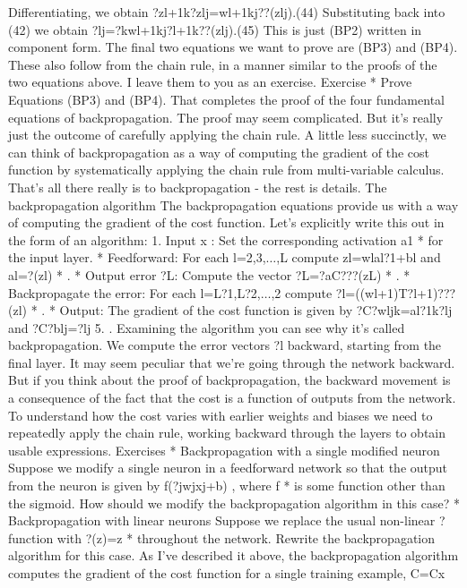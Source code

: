 Differentiating, we obtain 
?zl+1k?zlj=wl+1kj??(zlj).(44)
Substituting back into (42) we obtain 
?lj=?kwl+1kj?l+1k??(zlj).(45)
This is just (BP2) written in component form.
The final two equations we want to prove are (BP3) and (BP4). These also follow from the chain rule, in a manner similar to the proofs of the two equations above. I leave them to you as an exercise. 
Exercise
* Prove Equations (BP3) and (BP4). 
That completes the proof of the four fundamental equations of backpropagation. The proof may seem complicated. But it's really just the outcome of carefully applying the chain rule. A little less succinctly, we can think of backpropagation as a way of computing the gradient of the cost function by systematically applying the chain rule from multi-variable calculus. That's all there really is to backpropagation - the rest is details.
The backpropagation algorithm
The backpropagation equations provide us with a way of computing the gradient of the cost function. Let's explicitly write this out in the form of an algorithm: 
1. Input x
: Set the corresponding activation a1
*  for the input layer. 
*  Feedforward: For each l=2,3,$\ldots$,L compute zl=wlal?1+bl and al=?(zl)
*  .
*  Output error ?L: Compute the vector ?L=?aC???(zL)
*  .
*  Backpropagate the error: For each l=L?1,L?2,$\ldots$,2 compute ?l=((wl+1)T?l+1)???(zl)
*  .
*  Output: The gradient of the cost function is given by ?C?wljk=al?1k?lj and ?C?blj=?lj
5. . 
Examining the algorithm you can see why it's called backpropagation. We compute the error vectors ?l
backward, starting from the final layer. It may seem peculiar that we're going through the network backward. But if you think about the proof of backpropagation, the backward movement is a consequence of the fact that the cost is a function of outputs from the network. To understand how the cost varies with earlier weights and biases we need to repeatedly apply the chain rule, working backward through the layers to obtain usable expressions.
Exercises
* Backpropagation with a single modified neuron Suppose we modify a single neuron in a feedforward network so that the output from the neuron is given by f(?jwjxj+b)
, where f
*  is some function other than the sigmoid. How should we modify the backpropagation algorithm in this case?
*  Backpropagation with linear neurons Suppose we replace the usual non-linear ? function with ?(z)=z
* throughout the network. Rewrite the backpropagation algorithm for this case. 
As I've described it above, the backpropagation algorithm computes the gradient of the cost function for a single training example, C=Cx
